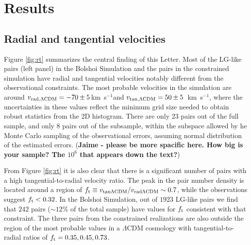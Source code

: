 \documentclass{emulateapj}
\newcommand{\kms}{\,km~s$^{-1}$}
\begin{document}
\section{Results}
\label{sec:results}




\subsection{Radial and tangential velocities}

Figure \ref{fig:rt} summarizes the central finding of this Letter. Most of the LG-like pairs (left panel) in the Bolshoi Simulation and the pairs in the constrained simulation have radial and tangential velocities notably different from the observational constraints.  The most probable velocities in the simulation are around $v_{\rm rad,\Lambda CDM} = -70\pm5$\kms and $v_{\rm tan,\Lambda CDM} = 50\pm5$ \kms, where the uncertainties in these values reflect the minimum grid size needed to obtain robust statistics from the 2D histogram. 
There are only 23 pairs out of the full sample, and only 8 pairs out of the subsample, within the subspace allowed by he Monte Carlo sampling of the observational errors, assuming normal distribution of the estimated errors. 
({\bf Jaime - please be more spacific here. How big is your sample? The $10^6$ that appears down the text?})

From Figure \ref{fig:rt} it is also clear that there is a significant number of pairs with a high tangential-to-radial velocity ratio. The peak in the pair number density is located around a region of $f_{\rm t}\equiv v_{\rm tan \Lambda CDM}/v_{\rm rad \Lambda CDM}\sim 0.7$, while the observations suggest $f_{\rm t}<0.32$. In the Bolshoi Simulation, out of $1923$ LG-like pairs we find that $242$ pairs ($\sim 12\%$ of the total sample) have values for $f_{\rm t}$ consistent with that constraint. The three pairs from the constrained realizations are also outside the region of the most probable values in a $\Lambda$CDM cosmology with tangential-to-radial ratios of $f_{\rm t}= 0.35, 0.45, 0.73$.
\end{document}
